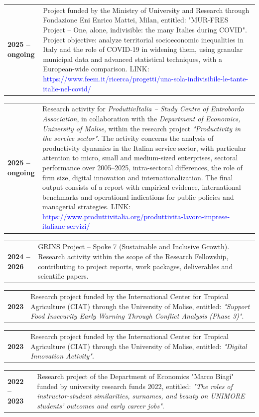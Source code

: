 \documentclass[11pt,a4paper,sans]{moderncv} %
\newcommand{\cvitemcols}[3]{%
  \begin{tabular}{p{#1}p{\dimexpr\linewidth-#1\relax}}
    \textbf{#2} & #3
  \end{tabular}\par\vspace{6pt}
}
\begin{document}
\cvitemcols{2cm}{2025 -- \newline ongoing}{Project funded by the Ministry of University and Research through Fondazione Eni Enrico Mattei, Milan, entitled: "MUR-FRES Project – One, alone, indivisible: the many Italies during COVID". Project objective: analyze territorial socioeconomic inequalities in Italy and the role of COVID-19 in widening them, using granular municipal data and advanced statistical techniques, with a European-wide comparison. LINK: \textcolor{blue}{https://www.feem.it/ricerca/progetti/una-sola-indivisibile-le-tante-italie-nel-covid/}}


\cvitemcols{2cm}{2025 --\newline ongoing}{Research activity for \textit{ProduttivItalia -- Study Centre of Entrobordo Association}, in collaboration with the \textit{Department of Economics, University of Molise}, within the research project \textit{"Productivity in the service sector"}. The activity concerns the analysis of productivity dynamics in the Italian service sector, with particular attention to micro, small and medium-sized enterprises, sectoral performance over 2005--2025, intra-sectoral differences, the role of firm size, digital innovation and internationalization. The final output consists of a report with empirical evidence, international benchmarks and operational indications for public policies and managerial strategies. LINK: 
\textcolor{blue}{https://www.produttivitalia.org/produttivita-lavoro-imprese-italiane-servizi/}}



\cvitemcols{2cm}{2024 -- 2026}{GRINS Project -- Spoke 7 (Sustainable and Inclusive Growth). Research activity within the scope of the Research Fellowship, contributing to project reports, work packages, deliverables and scientific papers.}


\cvitemcols{2cm}{2023}{Research project funded by the International Center for Tropical Agriculture (CIAT) through the University of Molise, entitled: \textit{"Support Food Insecurity Early Warning Through Conflict Analysis (Phase 3)"}.}

\cvitemcols{2cm}{2023}{Research project funded by the International Center for Tropical Agriculture (CIAT) through the University of Molise, entitled: \textit{"Digital Innovation Activity"}.}

\cvitemcols{2cm}{2022 -- 2023}{Research project of the Department of Economics "Marco Biagi" funded by university research funds 2022, entitled: \textit{"The roles of instructor-student similarities, surnames, and beauty on UNIMORE students' outcomes and early career jobs"}.}
\end{document}

